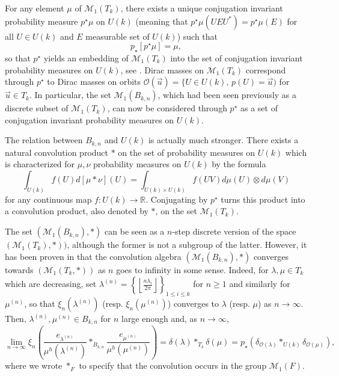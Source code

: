 \documentclass[10pt,11pt]{amsart}%
\begin{document}
For any element $\mu$ of $\mathcal{M}_1(T_k)$, there exists a unique conjugation invariant probability measure $p^{\star}\mu$ on $U(k)$ (meaning that $p^{\star}\mu(UEU^*)=p^{\star}\mu(E)$ for all $U\in U(k)$ and $E$ measurable set of $U(k)$) such that 
$$p_{\star}\left[p^{\star}\mu\right]=\mu,$$
so that $p^{\star}$ yields an embedding of $\mathcal{M}_1(T_k)$ into the set of conjugation invariant probability measures on $U(k)$, see \cite[Chapter 4]{AGZ}. Dirac masses on $\mathcal{M}_1(T_k)$ correspond through $p^{\star}$ to Dirac masses on orbits $\mathcal{O}(\vec{u})=\{U\in U(k),\, p(U)=\vec{u})$ for $\vec{u}\in T_k$. In particular, the set $\mathcal{M}_{1}(B_{k,n})$, which had been seen previously as a discrete subset of $\mathcal{M}_1(T_k)$, can now be considered through $p^{\star}$ as a set of conjugation invariant probability measures on $U(k)$. 

The relation between $B_{k,n}$ and $U(k)$ is actually much stronger. There exists a natural convolution product $*$ on the set of probability measures on $U(k)$ which is characterized for $\mu,\nu$ probability measures on $U(k)$ by the formula
$$\int_{U(k)}f(U)d\left[\mu*\nu\right](U)=\int_{U(k)\times U(k)}f(UV)d\mu(U)\otimes d\mu(V)$$
for any continuous map $f:U(k)\rightarrow \mathbb{R}$. Conjugating by $p^\star$ turns this product into a convolution product, also denoted by $*$, on the set $\mathcal{M}_1( T_{k})$.

The set $(\mathcal{M}_1(B_{k,n}),*)$ can be seen as a $n$-step discrete version of the space $(\mathcal{M}_1( T_{k}),*))$, although the former is not a subgroup of the latter.  However, it has been proven in \cite[Proposition 7.1]{De} that the convolution algebra $(\mathcal{M}_1(B_{k,n}),*)$ converges towards $(\mathcal{M}_1( T_{k},*))$ as $n$ goes to infinity in some sense. Indeed, for $\lambda,\mu\in  T_{k}$ which are decreasing, set $\lambda^{(n)}=\left\{\left\lfloor \frac{n\lambda_i}{2\pi}\right\rfloor\right\}_{1\leq i\leq k}$ for $n\geq 1$ and similarly for $\mu^{(n)}$, so that $\xi_{n}(\lambda^{(n)})$ (resp. $\xi_n(\mu^{(n)})$) converges to $\lambda$ (resp. $\mu$) as $n\rightarrow \infty$. Then, $\lambda^{(n)}, \mu^{(n)}\in B_{k,n}$ for $n$ large enough and, as $n\rightarrow \infty$,
$$\lim_{n\rightarrow \infty}\xi_n\left(\frac{e_{\lambda^{(n)}}}{\mu^h(\lambda^{(n)})}*_{B_{k,n}}\frac{e_{\mu^{(n)}}}{\mu^h(\mu^{(n)})}\right)=\delta(\lambda)*_{ T_{k}}\delta(\mu)
=p_{\star}(\delta_{\mathcal{O}(\lambda)}*_{U(k)}\delta_{\mathcal{O}(\mu)}),$$
where we wrote $*_F$ to specify that the convolution occurs in the group $\mathcal{M}_1(F)$.
\end{document}
